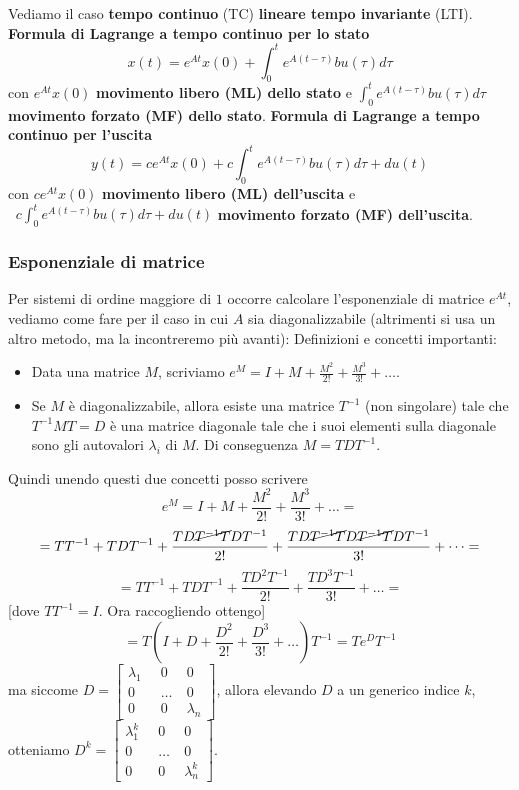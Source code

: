 \newline
Vediamo il caso \textbf{tempo continuo} (TC) \textbf{lineare tempo invariante} (LTI).\newline
\textbf{Formula di Lagrange a tempo continuo per lo stato}
\[
    x(t) = e^{At}x(0) + \int_{0}^{t}e^{A(t-\tau)}bu(\tau)d \tau
\]
con $e^{At}x(0)$ \textbf{movimento libero (ML) dello stato} e $\int_{0}^{t}e^{A(t-\tau)}bu(\tau)d \tau$ \textbf{movimento forzato (MF) dello stato}.\newline
\textbf{Formula di Lagrange a tempo continuo per l'uscita}
\[
    y(t) = c e^{At}x(0) + c\int_{0}^{t}e^{A(t-\tau)}bu(\tau)d \tau + du(t)
\]
con $ce^{At}x(0)$ \textbf{movimento libero (ML) dell'uscita} e $\;\; c\int_{0}^{t}e^{A(t-\tau)}bu(\tau)d \tau + du(t)$ \textbf{movimento forzato (MF) dell'uscita}.
\subsubsection*{Esponenziale di matrice}
Per sistemi di ordine maggiore di $1$ occorre calcolare l'esponenziale di matrice $e^{At}$, vediamo come fare per il caso in cui $A$ sia diagonalizzabile (altrimenti si usa un altro metodo, ma la incontreremo più avanti):\newline
Definizioni e concetti importanti:
\begin{itemize}
    \item Data una matrice $M$, scriviamo $e^M = I + M + \frac{M^2}{2!} + \frac{M^3}{3!}+\dots$.
    \item Se $M$ è diagonalizzabile, allora esiste una matrice $T^{-1}$ (non singolare) tale che $T^{-1} M T = D$ è una matrice diagonale tale che i suoi elementi sulla diagonale sono gli autovalori $\lambda_i$ di $M$. Di conseguenza $M = T D T^{-1}$.
\end{itemize}
Quindi unendo questi due concetti posso scrivere
\[
    e^M = I + M + \frac{M^2}{2!} + \frac{M^3}{3!}+\dots=
\]
\[
    = TT^{-1} + T D T^{-1} + \frac{TD\cancel{T^{-1} T}DT^{-1}}{2!} + \frac{TD \cancel{T^{-1} T}D \cancel{T^{-1} T}DT^{-1}}{3!} + \dots =
\]
\[
    = TT^{-1} + T D T^{-1} + \frac{TD^2T^{-1}}{2!} + \frac{TD^3T^{-1}}{3!} + \dots=
\]
[dove $TT^{-1} = I$. Ora raccogliendo ottengo]
\[
    = T(I + D + \frac{D^2}{2!} + \frac{D^3}{3!} + \dots)T^{-1} = T e^{D}T^{-1}
\]
ma siccome $D = \left[\begin{matrix}
    \lambda_1 \;\; &0 \;\; &0\\
    0 & \dots &0\\
    0 &0 & \lambda_n
\end{matrix}\right]$, allora elevando $D$ a un generico indice $k$, otteniamo $D^k= \left[\begin{matrix}
    \lambda_1^k \;\; &0 \;\; &0\\
    0 & \dots &0\\
    0 &0 & \lambda_n^k
\end{matrix}\right]$.\newline

